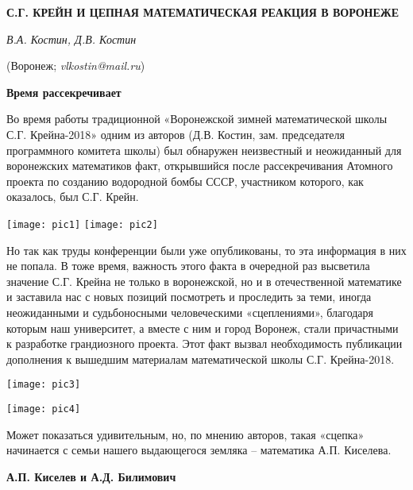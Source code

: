 
\sloppy





\begin{center}
    {\bf С.Г. КРЕЙН И ЦЕПНАЯ МАТЕМАТИЧЕСКАЯ РЕАКЦИЯ В ВОРОНЕЖЕ}

    {\it В.А. Костин, Д.В. Костин}

    (Воронеж; {\it vlkostin@mail.ru})
\end{center}


\begin{center}
{\bf Время рассекречивает}
\end{center}

Во время работы традиционной «Воронежской зимней математической школы С.Г. Крейна-2018» одним из авторов (Д.В. Костин, зам. председателя программного комитета школы) был обнаружен неизвестный и неожиданный для воронежских математиков факт, открывшийся после рассекречивания Атомного проекта по созданию водородной бомбы СССР, участником которого, как оказалось, был С.Г. Крейн.

\texttt{[image: pic1]}
\texttt{[image: pic2]}

Но так как труды конференции были уже опубликованы, то эта информация в них не попала. В тоже время, важность этого факта в очередной раз высветила значение С.Г. Крейна не только в воронежской, но и в отечественной математике и заставила нас с новых позиций посмотреть и проследить за теми, иногда неожиданными и судьбоносными человеческими «сцеплениями», благодаря которым наш университет, а вместе с ним и город Воронеж, стали причастными к разработке грандиозного проекта. Этот факт вызвал необходимость публикации дополнения к вышедшим материалам математической школы С.Г. Крейна-2018.

\texttt{[image: pic3]}

\texttt{[image: pic4]}

Может показаться удивительным, но, по мнению авторов, такая «сцепка» начинается с семьи нашего выдающегося земляка – математика А.П. Киселева.

\begin{center}
{\bf А.П. Киселев и А.Д. Билимович}
\end{center}

